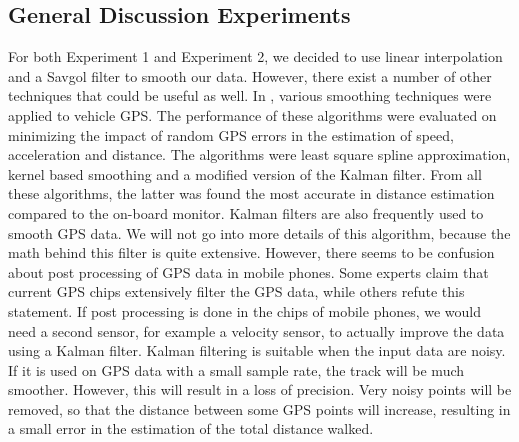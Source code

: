 \subsection{General Discussion Experiments}
For both Experiment 1 and Experiment 2, we decided to use linear interpolation and a Savgol filter to smooth our data.
However, there exist a number of other techniques that could be useful as well.
In \cite{jun2005smoothing}, various smoothing techniques were applied to vehicle GPS.
The performance of these algorithms were evaluated on minimizing the impact of random GPS errors in the estimation of speed, acceleration and distance.
The algorithms were least square spline approximation, kernel based smoothing and a modified version of the Kalman filter.
From all these algorithms, the latter was found the most accurate in distance estimation compared to the on-board monitor.
Kalman filters \cite{levy1997kalman} are also frequently used to smooth GPS data. 
We will not go into more details of this algorithm, because the math behind this filter is quite extensive.
However, there seems to be confusion about post processing of GPS data in mobile phones.
Some experts claim that current GPS chips extensively filter the GPS data, while others refute this statement.
If post processing is done in the chips of mobile phones, we would need a second sensor, for example a velocity sensor, to actually improve the data using a Kalman filter.
Kalman filtering is suitable when the input data are noisy. 
If it is used on GPS data with a small sample rate, the track will be much smoother.
However, this will result in a loss of precision. 
Very noisy points will be removed, so that the distance between some GPS points will increase, resulting in a small error in the estimation of the total distance walked.

